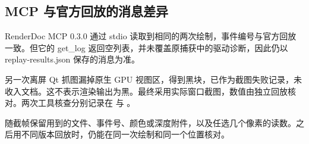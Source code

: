 \subsection{MCP 与官方回放的消息差异}
RenderDoc MCP 0.3.0 通过 stdio 读取到相同的两次绘制，事件编号与官方回放一致。但它的 get\_log 返回空列表，并未覆盖原捕获中的驱动诊断，因此仍以 replay-results.json 保存的消息为准。

另一次离屏 Qt 抓图漏掉原生 GPU 视图区，得到黑块，已作为截图失败记录，未收入文档。这不表示渲染输出为黑。最终采用实际窗口截图，数值由独立回放核对。两次工具核查分别记录在  与 。

随截帧保留用到的文件、事件号、颜色或深度附件，以及任选几个像素的读数。之后用不同版本回放时，仍能在同一次绘制和同一个位置核对。

\newpage


















